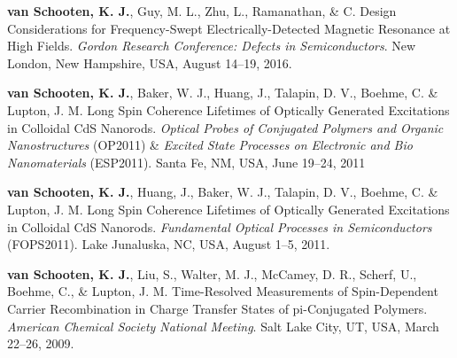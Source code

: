 \documentclass[11pt,letterpaper]{article}
\newcommand{\mhead}[1]{\leavevmode\marginpar{\sffamily\small #1}}
\begin{document}
\mhead{Conference\newline Posters}
\vspace{-1.1em} %
\begin{bibenum}

	\item \textbf{van Schooten, K. J.}, Guy, M. L., Zhu, L., Ramanathan, \& C. Design Considerations for Frequency-Swept Electrically-Detected Magnetic Resonance at High Fields. \textit{Gordon Research Conference: Defects in Semiconductors}. New London, New Hampshire, USA, August 14--19, 2016.

	\item \textbf{van Schooten, K. J.}, Baker, W. J., Huang, J., Talapin, D. V., Boehme, C. \& Lupton, J. M. Long Spin Coherence Lifetimes of Optically Generated Excitations in Colloidal CdS Nanorods. \textit{Optical Probes of Conjugated Polymers and Organic Nanostructures} (OP2011) \& \textit{Excited State Processes on Electronic and Bio Nanomaterials} (ESP2011). Santa Fe, NM, USA, June 19--24, 2011
	
	\item \textbf{van Schooten, K. J.}, Huang, J., Baker, W. J., Talapin, D. V., Boehme, C. \& Lupton, J. M. Long Spin Coherence Lifetimes of Optically Generated Excitations in Colloidal CdS Nanorods. \textit{Fundamental Optical Processes in Semiconductors} (FOPS2011). Lake Junaluska, NC, USA, August 1--5, 2011.
	
	\item \textbf{van Schooten, K. J.}, Liu, S., Walter, M. J., McCamey, D. R., Scherf, U., Boehme, C., \& Lupton, J. M. Time-Resolved Measurements of Spin-Dependent Carrier Recombination in Charge Transfer States of pi-Conjugated Polymers. \textit{American Chemical Society National Meeting}. Salt Lake City, UT, USA, March 22--26, 2009.

\end{bibenum}
\vspace{\baselineskip} %
\end{document}
